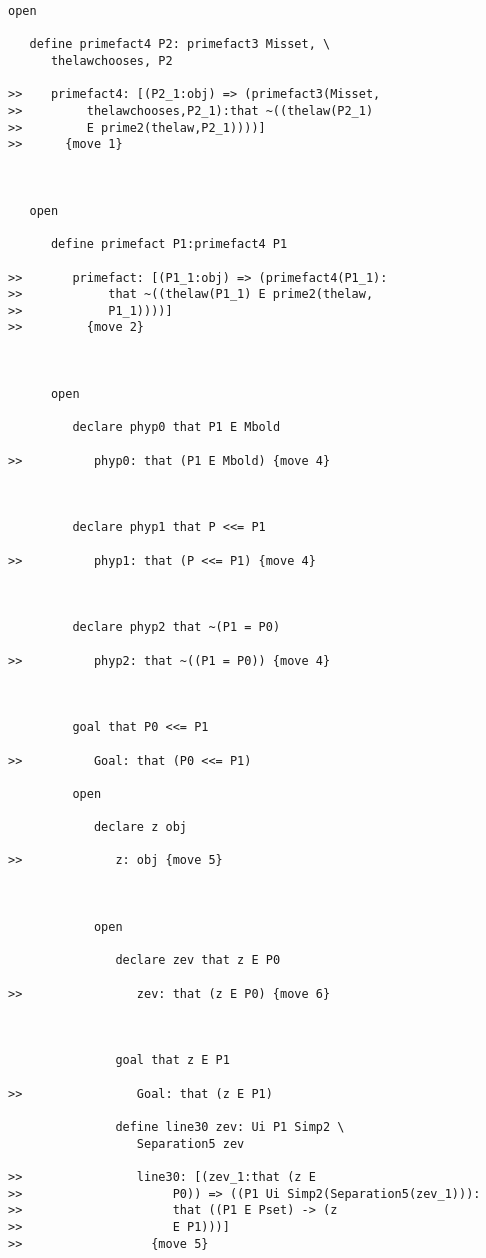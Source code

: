 \documentclass[12pt]{article}
\begin{document}
\begin{verbatim}
open

   define primefact4 P2: primefact3 Misset, \
      thelawchooses, P2

>>    primefact4: [(P2_1:obj) => (primefact3(Misset,
>>         thelawchooses,P2_1):that ~((thelaw(P2_1)
>>         E prime2(thelaw,P2_1))))]
>>      {move 1}



   open

      define primefact P1:primefact4 P1

>>       primefact: [(P1_1:obj) => (primefact4(P1_1):
>>            that ~((thelaw(P1_1) E prime2(thelaw,
>>            P1_1))))]
>>         {move 2}



      open

         declare phyp0 that P1 E Mbold

>>          phyp0: that (P1 E Mbold) {move 4}



         declare phyp1 that P <<= P1

>>          phyp1: that (P <<= P1) {move 4}



         declare phyp2 that ~(P1 = P0)

>>          phyp2: that ~((P1 = P0)) {move 4}



         goal that P0 <<= P1

>>          Goal: that (P0 <<= P1)

         open

            declare z obj

>>             z: obj {move 5}



            open

               declare zev that z E P0

>>                zev: that (z E P0) {move 6}



               goal that z E P1

>>                Goal: that (z E P1)

               define line30 zev: Ui P1 Simp2 \
                  Separation5 zev

>>                line30: [(zev_1:that (z E
>>                     P0)) => ((P1 Ui Simp2(Separation5(zev_1))):
>>                     that ((P1 E Pset) -> (z
>>                     E P1)))]
>>                  {move 5}




\end{verbatim}
\end{document}

